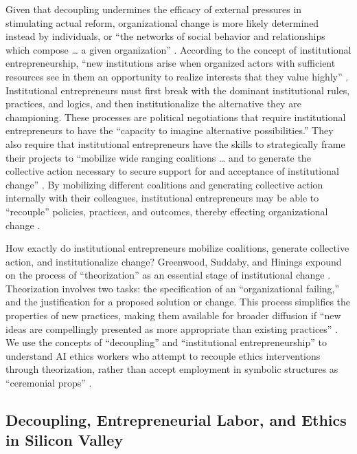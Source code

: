 \documentclass[sigconf]{acmart}
\begin{document}
Given that decoupling undermines the efficacy of external pressures in stimulating actual reform, organizational change is more likely determined instead by individuals, or “the networks of social behavior and relationships which compose … a given organization” \cite{meyer_institutionalized_1977}. According to the concept of institutional entrepreneurship, “new institutions arise when organized actors with sufficient resources see in them an opportunity to realize interests that they value highly” \cite{dimaggio_interest_1988}. Institutional entrepreneurs must first break with the dominant institutional rules, practices, and logics, and then institutionalize the alternative they are championing. These processes are political negotiations that require institutional entrepreneurs to have the “capacity to imagine alternative possibilities.” They also require that institutional entrepreneurs have the skills to strategically frame their projects to “mobilize wide ranging coalitions … and to generate the collective action necessary to secure support for and acceptance of institutional change” \cite{garud_institutional_2007}. By mobilizing different coalitions and generating collective action internally with their colleagues, institutional entrepreneurs may be able to “recouple” policies, practices, and outcomes, thereby effecting organizational change \cite{espeland_struggle_1998}.

How exactly do institutional entrepreneurs mobilize coalitions, generate collective action, and institutionalize change? Greenwood, Suddaby, and Hinings expound on the process of “theorization” as an essential stage of institutional change \cite{greenwood_theorizing_2002}. Theorization involves two tasks: the specification of an “organizational failing,” and the justification for a proposed solution or change. This process simplifies the properties of new practices, making them available for broader diffusion if “new ideas are compellingly presented as more appropriate than existing practices” \cite{greenwood_theorizing_2002}. We use the concepts of “decoupling” and “institutional entrepreneurship” to understand AI ethics workers who attempt to recouple ethics interventions through theorization, rather than accept employment in symbolic structures as “ceremonial props” \cite{vo_microfoundations_2016}.

\subsection{Decoupling, Entrepreneurial Labor, and Ethics in Silicon Valley}
\end{document}
